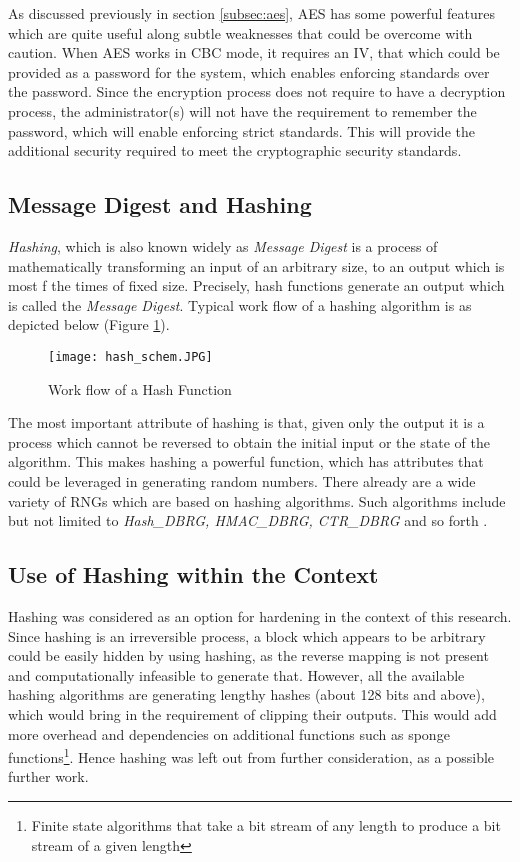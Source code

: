As discussed previously in section \ref{subsec:aes}, AES has some powerful features which are quite useful along subtle weaknesses that could be overcome with caution. When AES works in CBC mode, it requires an IV, that which could be provided as a password for the system, which enables enforcing standards over the password. Since the encryption process does not require to have a decryption process, the administrator(s) will not have the requirement to remember the password, which will enable enforcing strict standards. This will provide the additional security required to meet the cryptographic security standards.

\subsection{Message Digest and Hashing}
\textit{Hashing}, which is also known widely as \textit{Message Digest} is a process of mathematically transforming an input of an arbitrary size, to an output which is most f the times of fixed size. Precisely, hash functions generate an output which is called the \textit{Message Digest}. Typical work flow of a hashing algorithm is as depicted below (Figure \ref{fig:wrk_flw_hash}).

\begin{figure}[h!]
    \texttt{[image: hash\_schem.JPG]}
    \centering
    \caption{Work flow of a Hash Function}
    \label{fig:wrk_flw_hash}
\end{figure}

The most important attribute of hashing is that, given only the output it is a process which cannot be reversed to obtain the initial input or the state of the algorithm. This makes hashing a powerful function, which has attributes that could be leveraged in generating random numbers. There already are a wide variety of RNGs which are based on hashing algorithms. Such algorithms include but not limited to \textit{Hash\_DBRG, HMAC\_DBRG, CTR\_DBRG} and so forth \cite{rep_nist_sp_80090a}.

\subsection{Use of Hashing within the Context}
Hashing was considered as an option for hardening in the context of this research. Since hashing is an irreversible process, a block which appears to be arbitrary could be easily hidden by using hashing, as the reverse mapping is not present and computationally infeasible to generate that. However, all the available hashing algorithms are generating lengthy hashes (about 128 bits and above), which would bring in the requirement of clipping their outputs. This would add more overhead and dependencies on additional functions such as sponge functions\footnote{Finite state algorithms that take a bit stream of any length to produce a bit stream of a given length}. Hence hashing was left out from further consideration, as a possible further work.
